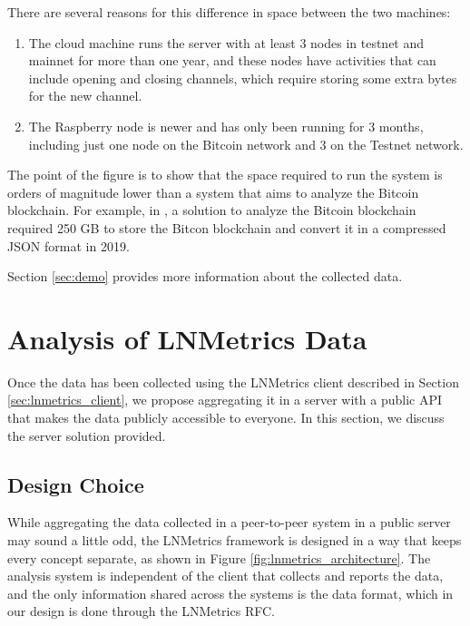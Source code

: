 There are several reasons for this difference in space between the two machines:

\begin{enumerate}
  \item The cloud machine runs the server with at least 3 nodes in testnet and mainnet for more
        than one year, and these nodes have activities that can include opening and closing channels,
        which require storing some extra bytes for the new channel.
  \item The Raspberry node is newer and has only been running for 3 months, including just one node on
        the Bitcoin network and 3 on the Testnet network.
\end{enumerate}

The point of the figure is to show that the space required to run the system is
orders of magnitude lower than a system that aims to analyze the Bitcoin blockchain.
For example, in \cite{Palazzo_Estrazione_di_Informazioni_2021}, a solution to analyze the Bitcoin blockchain
required 250 GB to store the Bitcon blockchain and convert it in a compressed JSON format in 2019.

Section \ref{sec:demo} provides more information about the collected data.

\section{Analysis of LNMetrics Data}
\label{sec:lnmetrics_server}

Once the data has been collected using the LNMetrics client described in 
Section \ref{sec:lnmetrics_client}, we propose aggregating it in a server with 
a public API that makes the data publicly accessible to everyone. In this 
section, we discuss the server solution provided.

\subsection{Design Choice}

While aggregating the data collected in a peer-to-peer system in a public 
server may sound a little odd, the LNMetrics framework is designed in a way 
that keeps every concept separate, as shown in Figure \ref{fig:lnmetrics_architecture}. 
The analysis system is independent of the client that collects and reports the data, and
the only information shared across the systems is the data format, which in our
design is done through the LNMetrics RFC.

